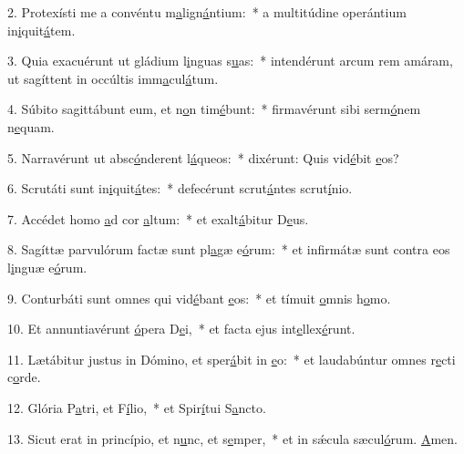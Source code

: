 2. Protexísti me a convéntu m\uline{a}lign\uline{á}ntium:~* a multitúdine operántium in\uline{i}quit\uline{á}tem.\par 
3. Quia exacuérunt ut gládium l\uline{i}nguas s\uline{u}as:~* intendérunt arcum rem amáram, ut sagíttent in occúltis imm\uline{a}cul\uline{á}tum.\par 
4. Súbito sagittábunt eum, et n\uline{o}n tim\uline{é}bunt:~* firmavérunt sibi serm\uline{ó}nem n\uline{e}quam.\par 
5. Narravérunt ut absc\uline{ó}nderent l\uline{á}queos:~* dixérunt: Quis vid\uline{é}bit \uline{e}os?\par 
6. Scrutáti sunt in\uline{i}quit\uline{á}tes:~* defecérunt scrut\uline{á}ntes scrut\uline{í}nio.\par 
7. Accédet homo \uline{a}d cor \uline{a}ltum:~* et exalt\uline{á}bitur D\uline{e}us.\par 
8. Sagíttæ parvulórum factæ sunt pl\uline{a}gæ e\uline{ó}rum:~* et infirmátæ sunt contra eos l\uline{i}nguæ e\uline{ó}rum.\par 
9. Conturbáti sunt omnes qui vid\uline{é}bant \uline{e}os:~* et tímuit \uline{o}mnis h\uline{o}mo.\par 
10. Et annuntiavérunt \uline{ó}pera D\uline{e}i,~* et facta ejus int\uline{e}llex\uline{é}runt.\par 
11. Lætábitur justus in Dómino, et sper\uline{á}bit in \uline{e}o:~* et laudabúntur omnes r\uline{e}cti c\uline{o}rde.\par 
12. Glória P\uline{a}tri, et F\uline{í}lio,~* et Spir\uline{í}tui S\uline{a}ncto.\par 
13. Sicut erat in princípio, et n\uline{u}nc, et s\uline{e}mper,~* et in sǽcula sæcul\uline{ó}rum. \uline{A}men.\par 
